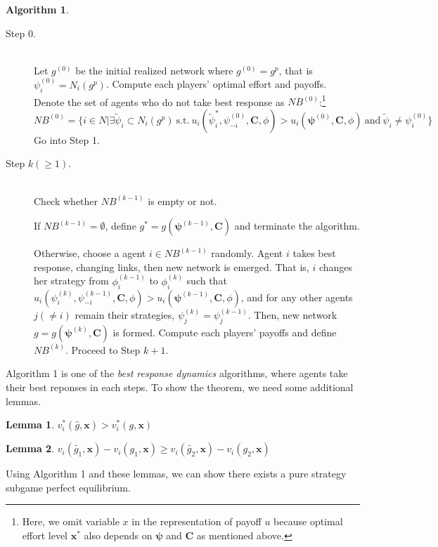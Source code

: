 \documentclass[12pt]{article}
\theoremstyle{definition}
\newtheorem{lemma}{Lemma}
\newtheorem{algorithm}{Algorithm}
\begin{document}
\begin{algorithm}
\ 
\begin{description}
	\item[Step 0.]\mbox{}\\
		Let $g^{(0)}$ be the initial realized network where $g^{(0)} = g^p$, that is $\psi_i^{(0)} = N_i(g^p)$.
		Compute each players' optimal effort and payoffs.
		Denote the set of agents who do not take best response as $NB^{(0)}$:\footnote{Here, we omit variable $x$ in the representation of payoff $u$ because optimal effort level $\bm{x}^*$ also depends on $\bm{\psi}$ and $\bm{C}$ as mentioned above.}
		\[ NB^{(0)} = \{i \in N | \exists \tilde{\psi}_i \subset N_i(g^p) \ \text{s.t.} \ u_i(\tilde{\psi}_i^*, \psi_{-i}^{(0)}, \bm{C}, \phi) > u_i(\bm{\psi}^{(0)}, \bm{C}, \phi) \ \text{and} \ \tilde{\psi}_i \neq \psi_i^{(0)} \} \]
		Go into Step 1.
	\item[Step $k(\ge 1)$.]\mbox{}\\
		Check whether $NB^{(k-1)}$ is empty or not.

		If $NB^{(k-1)} = \emptyset$, define $g^* = g(\bm{\psi}^{(k-1)}, \bm{C})$ and terminate the algorithm.

		Otherwise, choose a agent $i \in NB^{(k-1)}$ randomly.
		Agent $i$ takes best response, changing links, then new network is emerged.
		That is, $i$ changes her strategy from $\phi_i^{(k-1)}$ to $\phi_i^{(k)}$ such that $u_i(\psi_i^{(k)}, \psi_{-i}^{(k-1)}, \bm{C}, \phi) > u_i(\bm{\psi}^{(k-1)}, \bm{C}, \phi)$, and for any other agents $j (\neq i)$ remain their strategies, $\psi_j^{(k)} = \psi_j^{(k-1)}$.
		Then, new network $g = g(\bm{\psi}^{(k)}, \bm{C})$ is formed.
		Compute each players' payoffs and define $NB^{(k)}$.
		Proceed to Step $k+1$.
\end{description}
\end{algorithm}

Algorithm 1 is one of the {\it{best response dynamics}} algorithms, where agents take their best reponses in each steps.
To show the theorem, we need some additional lemmas.

\begin{lemma}
	$v_i^* (\hat{g}, \bm{x}) > v_i^* (g, \bm{x})$
\end{lemma}

\begin{lemma}
	$v_i(\tilde{g_1}, \bm{x}) - v_i(g_1, \bm{x}) \ge v_i(\tilde{g_2}, \bm{x}) - v_i(g_2, \bm{x})$
\end{lemma}

Using Algorithm 1 and these lemmas, we can show there exists a pure strategy subgame perfect equilibrium.
\end{document}
